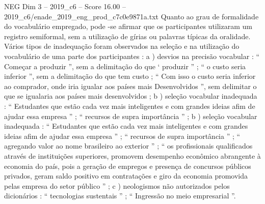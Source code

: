 \begin{textsample}{NEG Dim 3 – 2019\_c6 – Score 16.00 – 2019\_c6/enade\_2019\_eng\_prod\_c7c0e9871a.txt}
Quanto ao grau de formalidade do vocabulário empregado, pode -se afirmar que os participantes utilizaram um registro semiformal, sem a utilização de gírias ou palavras típicas da oralidade.
Vários tipos de inadequação foram observados na seleção e na utilização do vocabulário de uma parte dos participantes : a ) desvios na precisão vocabular : “ Começar a produzir ”, sem a delimitação do que ‘ produzir ” ; “ o custo seria inferior ”, sem a delimitação do que tem custo ; “ Com isso o custo seria inferior ao comprador, onde iria igualar aos países mais Desenvolvidos ”, sem delimitar o que se igualaria aos países mais desenvolvidos ; b ) seleção vocabular inadequada : “ Estudantes que estão cada vez mais inteligentes e com grandes ideias afim de ajudar essa empresa ” ; “ recursos de supra importância ” ; b ) seleção vocabular inadequada : “ Estudantes que estão cada vez mais inteligentes e com grandes ideias afim de ajudar essa empresa ” ; “ recursos de supra importância ” ; “ agregando valor ao nome brasileiro ao exterior ” ; “ os profissionais qualificados através de instituições superiores, promovem desempenho econômico abrangente à economia do país, pois a geração de empregos e presença de concursos públicos privados, geram saldo positivo em contratações e giro da economia promovida pelas empresa do setor público ” ; c ) neologismos não autorizados pelos dicionários : “ tecnologias sustentais ” ; “ Ingressão no meio empresarial ”.

\end{textsample}
